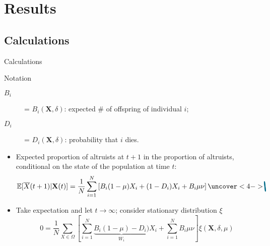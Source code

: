 \documentclass[aspectratio=169]{beamer}
\begin{document}
\section{Results}

\subsection{Calculations}


\begin{frame}{Calculations}
\begin{block}{Notation}
\begin{description}
\item[$B_i$] = $B_i(\mathbf{X}, \delta)$: expected \# of offspring of individual $i$;
\item[$D_i$] = $D_i(\mathbf{X}, \delta)$: probability that $i$ dies.
\end{description}
\end{block}
\pause
\begin{itemize}[<+->]
\item Expected proportion of altruists at $t+1$ in the proportion of altruists, conditional on the state of the population at time $t$:
%
\begin{displaymath}
\tikzmark{E1}\mathbb{E}[\overline{X}(t+1)|\mathbf{X}(t)]\tikzmark{E2} = \frac{1}{N}\sum_{i=1}^N \left[ B_i (1-\mu) X_i + (\tikzmark{O1}1\tikzmark{O2}-D_i)X_i + B_i \mu \nu \right] \uncover<4->{
\tikzstyle{stro}=[maincol, line width=1.5pt, line cap=round]
\tikz[remember picture, overlay]{ \draw[stro] (E1.north west)++(0,0.2) --(E2.south east);
\draw[stro] (O1.north west)++(0,0.2) --(O2.south east);
 }
}
\end{displaymath}

\item Take expectation and let $t\to \infty$; consider stationary distribution $\xi$
%
\begin{displaymath}
0 = \frac{1}{N} \sum_{X \in \Omega}\left[ \sum_{i=1}^N \underbrace{B_i (1-\mu) - D_i)}_{W_i} X_i + \sum_{i=1}^N B_i \mu \nu \right]\xi(\mathbf{X}, \delta, \mu)
\end{displaymath}
\end{itemize}
\end{frame}
\end{document}
